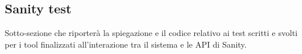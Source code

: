 \subsection{Sanity test}

Sotto-sezione che riporterà la spiegazione e il codice relativo ai test scritti e svolti per i tool finalizzati all'interazione tra il sistema e le API di Sanity.